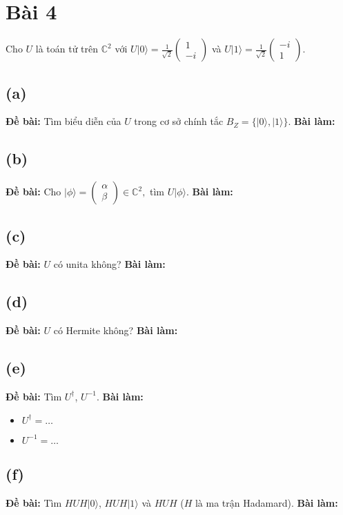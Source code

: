\section{Bài 4}
Cho $U$ là toán tử trên $\mathbb{C}^{2}$ với $U|0\rangle=\frac{1}{\sqrt{2}}\begin{pmatrix}1\\ -i\end{pmatrix}$ và $U|1\rangle=\frac{1}{\sqrt{2}}\begin{pmatrix}-i\\ 1\end{pmatrix}$.

\subsection{(a)}
\textbf{Đề bài:} Tìm biểu diễn của $U$ trong cơ sở chính tắc $B_{Z}=\{|0\rangle,|1\rangle\}$.
\textbf{Bài làm:}

\subsection{(b)}
\textbf{Đề bài:} Cho $|\phi\rangle=\begin{pmatrix}\alpha\\ \beta\end{pmatrix}\in\mathbb{C}^{2},$ tìm $U|\phi\rangle$.
\textbf{Bài làm:}

\subsection{(c)}
\textbf{Đề bài:} $U$ có unita không?
\textbf{Bài làm:}

\subsection{(d)}
\textbf{Đề bài:} $U$ có Hermite không?
\textbf{Bài làm:}

\subsection{(e)}
\textbf{Đề bài:} Tìm $U^{\dagger}$, $U^{-1}$.
\textbf{Bài làm:}
\begin{itemize}
    \item $U^{\dagger} = \dots$
    \item $U^{-1} = \dots$
\end{itemize}

\subsection{(f)}
\textbf{Đề bài:} Tìm $HUH|0\rangle$, $HUH|1\rangle$ và $HUH$ ($H$ là ma trận Hadamard).
\textbf{Bài làm:}

